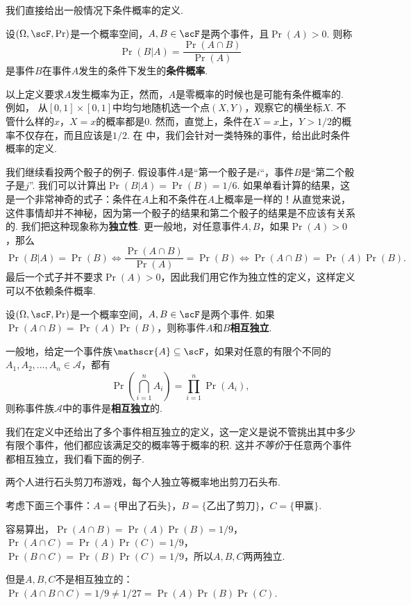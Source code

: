 我们直接给出一般情况下条件概率的定义. 

\begin{definition}[条件概率]
设$(\Omega,\scF,\Pr)$是一个概率空间，$A,B\in\scF$是两个事件，且$\Pr(A)>0$. 则称
\[
    \Pr(B|A) = \frac{\Pr(A\cap B)}{\Pr(A)}
\]
是事件$B$在事件$A$发生的条件下发生的\textbf{条件概率}. 
\end{definition}

以上定义要求$A$发生概率为正，然而，$A$是零概率的时候也是可能有条件概率的. 例如，
从$[0,1]\times[0,1]$中均匀地随机选一个点$(X,Y)$，观察它的横坐标$X$. 不管什么样的$x$，$X=x$的概率都是$0$. 然而，直觉上，条件在$X=x$上，$Y>1/2$的概率不仅存在，而且应该是$1/2$. 在 中，我们会针对一类特殊的事件，给出此时条件概率的定义. 

我们继续看投两个骰子的例子. 假设事件$A$是“第一个骰子是$i$“，事件$B$是“第二个骰子是$j$”. 我们可以计算出$\Pr(B|A)=\Pr(B)=1/6$. 如果单看计算的结果，这是一个非常神奇的式子：条件在$A$上和不条件在$A$上概率是一样的！从直觉来说，这件事情却并不神秘，因为第一个骰子的结果和第二个骰子的结果是不应该有关系的. 我们把这种现象称为\textbf{独立性}. 更一般地，对任意事件$A,B$，如果$\Pr(A)>0$，那么
\[\Pr(B|A)=\Pr(B)\iff \frac{\Pr(A\cap B)}{\Pr(A)}=\Pr(B)\iff \Pr(A\cap B)=\Pr(A)\Pr(B).\]
最后一个式子并不要求$\Pr(A)>0$，因此我们用它作为独立性的定义，这样定义可以不依赖条件概率. 

\begin{definition}[独立性]
设$(\Omega,\scF,\Pr)$是一个概率空间，$A,B\in\scF$是两个事件. 如果$\Pr(A\cap B)=\Pr(A)\Pr(B)$，则称事件$A$和$B$\textbf{相互独立}. 

一般地，给定一个事件族$\mathscr{A}\subseteq\scF$，如果对任意的有限个不同的$A_1,A_2,\ldots,A_n\in\mathscr{A}$，都有
\[
    \Pr\left(\bigcap_{i=1}^n A_i\right) = \prod_{i=1}^n \Pr(A_i),
\]
则称事件族$\mathscr{A}$中的事件是\textbf{相互独立}的. 
\end{definition}

我们在定义中还给出了多个事件相互独立的定义，这一定义是说不管挑出其中多少有限个事件，他们都应该满足交的概率等于概率的积. 这并\emph{不等价}于任意两个事件都相互独立，我们看下面的例子. 

\begin{example}
两个人进行石头剪刀布游戏，每个人独立等概率地出剪刀石头布. 

考虑下面三个事件：$A=\{\text{甲出了石头}\}$，$B=\{\text{乙出了剪刀}\}$，$C=\{\text{甲赢}\}$.

容易算出，$\Pr(A\cap B)=\Pr(A)\Pr(B)=1/9$，$\Pr(A\cap C)=\Pr(A)\Pr(C)=1/9$，$\Pr(B\cap C)=\Pr(B)\Pr(C)=1/9$，所以$A,B,C$两两独立. 

但是$A,B,C$不是相互独立的：$\Pr(A\cap B\cap C)=1/9\neq 1/27=\Pr(A)\Pr(B)\Pr(C)$.
\end{example}

